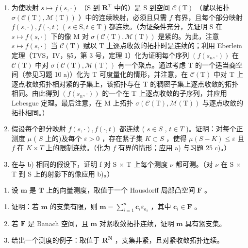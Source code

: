 \begin{enumerate}
\def\labelenumi{\alph{enumi})}
\item
  为使映射 \(s \mapsto f(s, \cdot)\) （S 到 \(\mathbf{R}^{\mathrm{T}}\) 中的）是 S 到空间 \(\mathcal{C}(\mathrm{T})\) （赋以拓扑 \(\sigma(\mathcal{C}(\mathrm{T}), \mathcal{M}(\mathrm{T}))\) ）中的连续映射，必须且只需 \(f\) 有界，且每个部分映射 \(f(s, \cdot), f(\cdot, t)\) ( \(s \in \mathrm{S}, t \in \mathrm{T}\) ) 都连续。（为证条件充分，先证明 S 在 \(s \mapsto f(s, \cdot)\) 下的像 M 对 \(\sigma(\mathcal{C}(\mathrm{T}), \mathcal{M}(\mathrm{T}))\) 是紧的。为此，注意 \(s \mapsto f(s, \cdot)\) 当 \(\mathcal{C}(\mathrm{T})\) 赋以 T 上逐点收敛的拓扑时是连续的；利用 Eberlein 定理（TVS，IV，§5，第 3 号，定理 1）化为证明每个序列 \((f(s_n, \cdot))\) 在 \(\mathcal{C}(\mathrm{T})\) 中对 \(\sigma(\mathcal{C}(\mathrm{T}), \mathcal{M}(\mathrm{T}))\) 有一个聚点。通过考虑 T 的一个适当商空间（参见习题 10 a)）化为 T 可度量化的情形，并注意，在 \(\mathcal{C}(\mathrm{T})\) 中对 T 上逐点收敛拓扑相对紧的子集上，该拓扑与在 T 的稠密子集上逐点收敛的拓扑相同。由此得到 \((f(s_n, \cdot))\) 的一个在 T 上逐点收敛的子序列，并应用 Lebesgue 定理。最后注意，在 M 上拓扑 \(\sigma(\mathcal{C}(\mathrm{T}), \mathcal{M}(\mathrm{T}))\) 与逐点收敛的拓扑相同。）
\item
  假设每个部分映射 \(f(s, \cdot), f(\cdot, t)\) 都连续 ( \(s \in S\) , \(t \in T\) )。证明：对每个正测度 \(\mu\) ( \(S\) 上的)及每个 \(\varepsilon > 0\) ，存在紧子集 \(K \subset S\) ，使得 \(\mu(S - K) \leqslant \varepsilon\) 且 \(f\) 在 \(K \times T\) 上的限制连续。（化为 \(f\) 有界的情形；应用 a) 与习题 25 c)。）
\item
  在与 b) 相同的假设下，证明 f 对 S × T 上每个测度 \(\nu\) 都可测。（对 \(\nu\) 在 S × T 到 S 上的射影下的像应用 b)。）
\end{enumerate}

\begin{enumerate}
\def\labelenumi{\arabic{enumi})}
\setcounter{enumi}{26}
\tightlist
\item
  设 \(\mathbf{m}\) 是 \(\mathbf{T}\) 上的向量测度，取值于一个 Hausdorff 局部凸空间 \(\mathbf{F}\) 。
\end{enumerate}

\begin{enumerate}
\def\labelenumi{\alph{enumi})}
\item
  证明：若 \(\mathbf{m}\) 的支集有限，则 \(\mathbf{m} = \sum_{i=1}^{n} \mathbf{c}_i \varepsilon_{a_i}\) ，其中 \(\mathbf{c}_i \in \mathbf{F}\) 。
\item
  若 \(\mathbf{F}\) 是 Banach 空间，且 \(\mathbf{m}\) 对紧收敛拓扑连续，证明 \(\mathbf{m}\) 具有紧支集。
\item
  给出一个测度的例子：取值于 \(\mathbf{R}^{\mathbf{N}}\) ，支集非紧，且对紧收敛拓扑连续。
\end{enumerate}

\setcounter{exercisegroup}{3}
\edef\CurrentExerciseGroup{\arabic{exercisegroup}}
